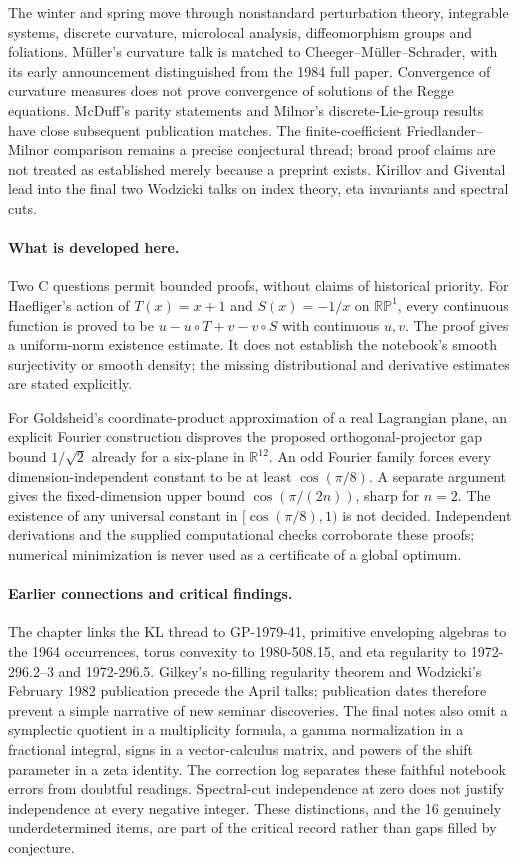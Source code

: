 The winter and spring move through nonstandard perturbation theory,
integrable systems, discrete curvature, microlocal analysis, diffeomorphism
groups and foliations. M\"uller's curvature talk is matched to
Cheeger--M\"uller--Schrader, with its early announcement distinguished from
the 1984 full paper. Convergence of curvature measures does not prove
convergence of solutions of the Regge equations. McDuff's parity statements
and Milnor's discrete-Lie-group results have close subsequent publication
matches. The finite-coefficient Friedlander--Milnor comparison remains a
precise conjectural thread; broad proof claims are not treated as established
merely because a preprint exists. Kirillov and Givental lead into the final
two Wodzicki talks on index theory, eta invariants and spectral cuts.

\paragraph{What is developed here.}
Two C questions permit bounded proofs, without claims of historical priority.
For Haefliger's action of \(T(x)=x+1\) and \(S(x)=-1/x\) on
\(\mathbb {RP}^1\), every continuous function is proved to be
\(u-u\circ T+v-v\circ S\) with continuous \(u,v\). The proof gives a
uniform-norm existence estimate. It does not establish the notebook's
smooth surjectivity or smooth density; the missing distributional and
derivative estimates are stated explicitly.

For Goldsheid's coordinate-product approximation of a real Lagrangian plane,
an explicit Fourier construction disproves the proposed orthogonal-projector
gap bound \(1/\sqrt2\) already for a six-plane in \(\mathbb R^{12}\).
An odd Fourier family forces every dimension-independent constant to be at
least \(\cos(\pi/8)\). A separate argument gives the fixed-dimension upper
bound \(\cos(\pi/(2n))\), sharp for \(n=2\). The existence of any universal
constant in \([\cos(\pi/8),1)\) is not decided. Independent derivations and
the supplied computational checks corroborate these proofs; numerical
minimization is never used as a certificate of a global optimum.

\paragraph{Earlier connections and critical findings.}
The chapter links the KL thread to GP-1979-41, primitive enveloping algebras
to the 1964 occurrences, torus convexity to 1980-508.15, and eta regularity
to 1972-296.2--3 and 1972-296.5. Gilkey's no-filling regularity theorem and
Wodzicki's February 1982 publication precede the April talks; publication
dates therefore prevent a simple narrative of new seminar discoveries.
The final notes also omit a symplectic quotient in a multiplicity formula,
a gamma normalization in a fractional integral, signs in a vector-calculus
matrix, and powers of the shift parameter in a zeta identity. The correction
log separates these faithful notebook errors from doubtful readings.
Spectral-cut independence at zero does not justify independence at every
negative integer. These distinctions, and the 16 genuinely underdetermined
items, are part of the critical record rather than gaps filled by conjecture.
